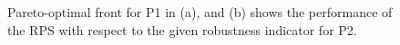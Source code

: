 \documentclass{llncs}
\begin{document}


\begin{figure}
\centering
{}
\caption{Pareto-optimal front for P1 in (a), and (b) shows the performance of the RPS with respect to the given robustness indicator for P2.}
\label{fig:reference_sets}
\end{figure}
\end{document}

